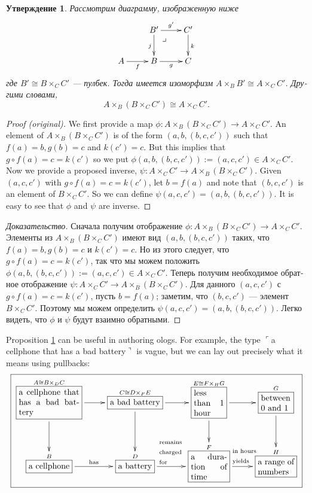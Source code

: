 \documentclass[a4paper]{book}
\makeatletter
\def\tn{\textnormal}
\def\to{\rightarrow}
\def\taking{\colon}
\def\iso{\cong}
\def\rr{\raggedright}
\newcommand{\LA}[2]{\ar[#1]^-{\tn {#2}}}
\newcommand{\obox}[3]{\stackrel{#1}{\fbox{\parbox{#2}{#3}}}}
\newcommand{\smbox}[2]{\stackrel{#1}{\fbox{#2}}}
\newcommand{\fakebox}[1]{\tn{$\ulcorner$#1$\urcorner$}}
\def\ullimit{\ar@{}[rd]|(.3)*+{\lrcorner}}
\theoremstyle{myth}
\newenvironment{proofENG}{\begin{proof}[Proof (original)]}{\end{proof}}
\newtheorem{propositionRUS}[envRUS]{Утверждение}
\newenvironment{proofRUS}{\begin{proof}[Доказательство]}{\end{proof}}
\makeatother
\begin{document}
\begin{russian}
\begin{propositionRUS}\label{prop:pasting}
Рассмотрим диаграмму, изображенную ниже
$$
\xymatrix{
&B'\ar[r]^{g'}\ar[d]_j\ullimit&C'\ar[d]^k\\
A\ar[r]_f&B\ar[r]_g&C}
$$
где $B'\iso B\times_CC'$ — пулбек. Тогда имеется изоморфизм $A\times_BB'\iso A\times_CC'$. Другими словами, $$A\times_B(B\times_CC')\iso A\times_CC'.$$
\end{propositionRUS}

\begin{proofENG}
We first provide a map $\phi\taking A\times_B(B\times_CC')\to A\times_CC'$. An element of $A\times_B(B\times_CC')$ is of the form $(a,b,(b,c,c'))$ such that $f(a)=b, g(b)=c$ and $k(c')=c$. But this implies that $g\circ f(a)=c=k(c')$ so we put $\phi(a,b,(b,c,c')):=(a,c,c')\in A\times_CC'$. Now we provide a proposed inverse, $\psi\taking A\times_CC'\to A\times_B(B\times_CC')$. Given $(a,c,c')$ with $g\circ f(a)=c=k(c')$, let $b=f(a)$ and note that $(b,c,c')$ is an element of $B\times_CC'$. So we can define $\psi(a,c,c')=(a,b,(b,c,c'))$. It is easy to see that $\phi$ and $\psi$ are inverse.
\end{proofENG}

\begin{proofRUS}
Сначала получим отображение $\phi\taking A\times_B(B\times_CC')\to A\times_CC'$. Элементы из $A\times_B(B\times_CC')$ имеют вид $(a,b,(b,c,c'))$ таких, что $f(a)=b, g(b)=c$ и $k(c')=c$. Но из этого следует, что $g\circ f(a)=c=k(c')$, так что мы можем положить $\phi(a,b,(b,c,c')):=(a,c,c')\in A\times_CC'$. Теперь получим необходимое обратное отображение $\psi\taking A\times_CC'\to A\times_B(B\times_CC')$. Для данного $(a,c,c')$ с $g\circ f(a)=c=k(c')$, пусть $b=f(a)$; заметим, что $(b,c,c')$ — элемент $B\times_CC'$. Поэтому мы можем определить $\psi(a,c,c')=(a,b,(b,c,c'))$. Легко видеть, что $\phi$ и $\psi$ будут взаимно обратными.
\end{proofRUS}

Proposition \ref{prop:pasting} can be useful in authoring ologs. For example, the type \fakebox{a cellphone that has a bad battery} is vague, but we can lay out precisely what it means using pullbacks:
\small
\begin{align}\label{dia:bad battery}
\fbox{\xymatrixnocompile{\obox{A\iso B\times_DC}{1in}{a cellphone that has a bad battery}\ar[r]\ar[d]&\smbox{C\iso D\times_FE}{a bad battery}\ar[r]\ar[d]&\obox{E\iso F\times_HG}{.5in}{less than 1 hour}\ar[r]\ar[d]&\obox{G}{.5in}{between 0 and 1}\ar[d]\\\smbox{B}{a cellphone}\LA{r}{has}&\smbox{D}{a battery}\LA{r}{\parbox{.4in}{\rr remains charged for}}&\obox{F}{.6in}{a duration of time}\LA{r}{\hspace{.07in}\parbox{.4in}{\rr in hours yields}}&\obox{H}{.6in}{a range of numbers}}}
\end{align}\normalsize


\end{russian}
\end{document}
